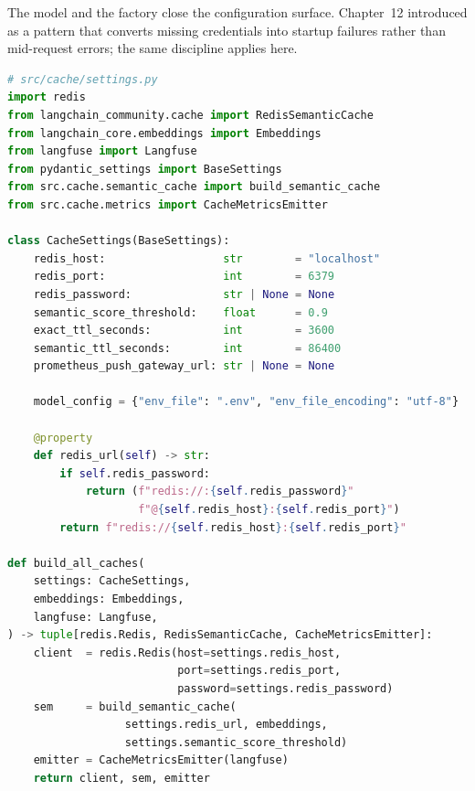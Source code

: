 The  model and the  factory
close the configuration surface. Chapter~12 introduced 
as a pattern that converts missing credentials into startup failures
rather than mid-request errors; the same discipline applies here.

\begin{lstlisting}[language=Python,
  caption={CacheSettings and build\_all\_caches factory},
  label={lst:cache-settings}]
# src/cache/settings.py
import redis
from langchain_community.cache import RedisSemanticCache
from langchain_core.embeddings import Embeddings
from langfuse import Langfuse
from pydantic_settings import BaseSettings
from src.cache.semantic_cache import build_semantic_cache
from src.cache.metrics import CacheMetricsEmitter

class CacheSettings(BaseSettings):
    redis_host:                  str        = "localhost"
    redis_port:                  int        = 6379
    redis_password:              str | None = None
    semantic_score_threshold:    float      = 0.9
    exact_ttl_seconds:           int        = 3600
    semantic_ttl_seconds:        int        = 86400
    prometheus_push_gateway_url: str | None = None

    model_config = {"env_file": ".env", "env_file_encoding": "utf-8"}

    @property
    def redis_url(self) -> str:
        if self.redis_password:
            return (f"redis://:{self.redis_password}"
                    f"@{self.redis_host}:{self.redis_port}")
        return f"redis://{self.redis_host}:{self.redis_port}"

def build_all_caches(
    settings: CacheSettings,
    embeddings: Embeddings,
    langfuse: Langfuse,
) -> tuple[redis.Redis, RedisSemanticCache, CacheMetricsEmitter]:
    client  = redis.Redis(host=settings.redis_host,
                          port=settings.redis_port,
                          password=settings.redis_password)
    sem     = build_semantic_cache(
                  settings.redis_url, embeddings,
                  settings.semantic_score_threshold)
    emitter = CacheMetricsEmitter(langfuse)
    return client, sem, emitter
\end{lstlisting}

